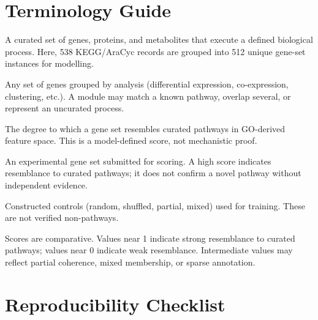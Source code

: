 \documentclass[12pt,letterpaper,oneside,openany]{book}
\begin{document}
\appendix

\chapter{Terminology Guide}
\label{app:terminology}

\begin{description}[style=nextline,leftmargin=1.5em]
\item[Pathway] A curated set of genes, proteins, and metabolites that execute a defined biological process. Here, 538 KEGG/AraCyc records are grouped into 512 unique gene-set instances for modelling.
\item[Gene module] Any set of genes grouped by analysis (differential expression, co-expression, clustering, etc.). A module may match a known pathway, overlap several, or represent an uncurated process.
\item[Pathway-like coherence] The degree to which a gene set resembles curated pathways in GO-derived feature space. This is a model-defined score, not mechanistic proof.
\item[Candidate gene set] An experimental gene set submitted for scoring. A high score indicates resemblance to curated pathways; it does not confirm a novel pathway without independent evidence.
\item[Negative gene set] Constructed controls (random, shuffled, partial, mixed) used for training. These are not verified non-pathways.
\item[Score interpretation] Scores are comparative. Values near 1 indicate strong resemblance to curated pathways; values near 0 indicate weak resemblance. Intermediate values may reflect partial coherence, mixed membership, or sparse annotation.
\end{description}

\chapter{Reproducibility Checklist}
\label{app:repro_checklist}
\end{document}
